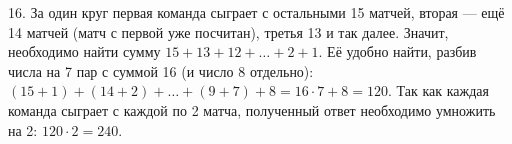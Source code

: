 16. За один круг первая команда сыграет с остальными 15 матчей, вторая --- ещё 14 матчей (матч с первой уже посчитан), третья 13 и так далее. Значит, необходимо найти сумму $15+13+12+\ldots+2+1.$ Её удобно найти, разбив числа на 7 пар с суммой 16 (и число 8 отдельно): $(15+1)+(14+2)+\ldots+(9+7)+8=16\cdot7+8=120.$ Так как каждая команда сыграет с каждой по 2 матча, полученный ответ необходимо умножить на 2: $120\cdot2=240.$\\
